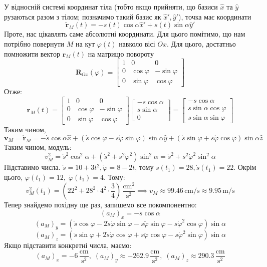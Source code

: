 \documentclass[12pt]{extarticle}
\begin{document}
У відносній системі координат тіла (тобто якщо прийняти, що базиси $\hat{x}$ та $\hat{y}$ рузаються разом з тілом; позначимо такий базис як $\hat{x}',\hat{y}'$), точка має координати 
\[
\widetilde{\mathbf{r}}_M(t) = -s(t)\cos \alpha \hat{x}' + s(t)\sin \alpha \hat{y}'
\]
Проте, нас цікавлять саме абсолютні координати. Для цього помітимо, що нам потрібно повернути $M$ на кут $\varphi(t)$ навколо вісі $Ox$. Для цього, достатньо помножити вектор $\mathbf{r}_M(t)$ на матрицю повороту
\[
\boldsymbol{R}_{Ox}(\varphi) = \begin{bmatrix}
    1 & 0 & 0 \\ 0 & \cos \varphi & -\sin \varphi \\ 0 & \sin \varphi & \cos \varphi
\end{bmatrix}
\]
Отже:
\[
\mathbf{r}_M(t) = \begin{bmatrix}
    1 & 0 & 0 \\ 0 & \cos \varphi & -\sin \varphi \\ 0 & \sin \varphi & \cos \varphi
\end{bmatrix}\begin{bmatrix}
    -s \cos \alpha \\ s \sin \alpha \\ 0
\end{bmatrix} = \begin{bmatrix}
    -s \cos \alpha \\ s \sin \alpha \cos \varphi \\ s \sin \alpha \sin \varphi
\end{bmatrix}
\]
Таким чином,
\[
\mathbf{v}_M = \dot{\mathbf{r}}_M = -\dot{s} \cos\alpha \hat{x} + (\dot{s}\cos\varphi - s\dot{\varphi}\sin\varphi)\sin\alpha\hat{y} + (\dot{s}\sin\varphi + s\dot{\varphi}\cos\varphi)\sin\alpha\hat{z}
\]
Таким чином, модуль:
\[
v_M^2 = \dot{s}^2\cos^2\alpha + (\dot{s}^2+s^2\dot{\varphi}^2)\sin^2\alpha = \dot{s}^2 + s^2\dot{\varphi}^2 \sin^2\alpha
\]
Підставимо числа. $\dot{s}=10+3t^2,\dot{\varphi}=8-2t$, тому $s(t_1)=28,\dot{s}(t_1)=22$. Окрім цього, $\varphi(t_1)=12,\;\dot{\varphi}(t_1)=4$. Тому:
\[
v_M^2(t_1) = \left(22^2 + 28^2 \cdot 4^2 \cdot \frac{3}{4}\right) \, \frac{\text{cm}^2}{\text{s}^2} \implies v_M \approx 99.46 \, \text{cm/s} \approx 9.95 \, \text{m}/\text{s}
\]
Тепер знайдемо похідну ще раз, запишемо все покомпонентно:
\[
(a_M)_x = -\ddot{s} \cos \alpha 
\]
\[
(a_M)_y = (\ddot{s}\cos\varphi - 2\dot{s}\dot{\varphi}\sin\varphi - s\ddot{\varphi}\sin\varphi - s\dot{\varphi}^2 \cos\varphi)\sin\alpha
\]
\[
(a_M)_z = (\ddot{s}\sin\varphi + 2\dot{s}\dot{\varphi}\cos\varphi + s\ddot{\varphi}\cos\varphi - s\dot{\varphi}^2 \sin\varphi)\sin\alpha
\]
Якщо підставити конкретні числа, маємо:
\[
(a_M)_x = -6 \, \frac{\text{cm}}{\text{s}^2}, \; (a_M)_y \approx -262.9 \, \frac{\text{cm}}{\text{s}^2}, \; (a_M)_z \approx 290.3 \, \frac{\text{cm}}{\text{s}^2}
\]
\end{document}
